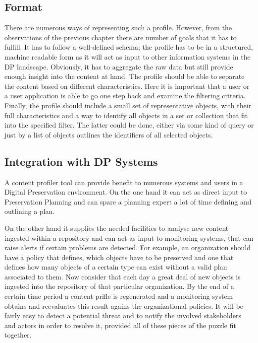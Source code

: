 \subsection{Format}
There are numerous ways of representing such a profile. However, from the observations of the previous chapter there are number of goals that it has to fulfill.
It has to follow a well-defined schema; the profile has to be in a structured, machine readable form as it will act as input to other information systems in the DP landscape.
Obviously, it has to aggregate the raw data but still provide enough insight into the content at hand. The profile should be able to separate the content based on different characteristics. Here it is important that a user or a user application is able to go one step back and examine the filtering criteria. Finally, the profile should include a small set of representative objects, with their full characteristics and a way to identify all objects in a set or collection that fit into the specified filter. The latter could be done, either via some kind of query or just by a list of objects outlines the identifiers of all selected objects.

\subsection{Integration with DP Systems}
A content profiler tool can provide benefit to numerous systems and users in a Digital Preservation environment. On the one hand it can act as direct input to Preservation Planning and can spare a planning expert a lot of time defining and outlining a plan. 

On the other hand it supplies the needed facilities to analyse new content ingested within a repository and can act as input to monitoring systems, that can raise alerts if certain problems are detected. For example, an organization should have a policy that defines, which objects have to be preserved and one that defines how many objects of a certain type can exist without a valid plan associated to them. Now consider that each day a great deal of new objects is ingested into the repository of that particular organization. By the end of a certain time period a content prifle is regenerated and a monitoring system obtains and reevaluates this result agains the organizational policies. It will be fairly easy to detect a potential threat and to notify the involved stakeholders and actors in order to resolve it, provided all of these pieces of the puzzle fit together.


